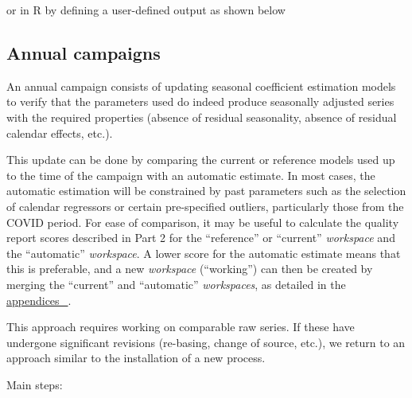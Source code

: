 \documentclass[
  letterpaper,
  DIV=11,
  numbers=noendperiod]{scrreprt}
\newenvironment{Shaded}{\begin{snugshade}}{\end{snugshade}}
\newcommand{\AttributeTok}[1]{\textcolor[rgb]{0.40,0.45,0.13}{#1}}
\newcommand{\FunctionTok}[1]{\textcolor[rgb]{0.28,0.35,0.67}{#1}}
\newcommand{\NormalTok}[1]{\textcolor[rgb]{0.00,0.23,0.31}{#1}}
\newcommand{\OtherTok}[1]{\textcolor[rgb]{0.00,0.23,0.31}{#1}}
\newcommand{\SpecialCharTok}[1]{\textcolor[rgb]{0.37,0.37,0.37}{#1}}
\newcommand{\StringTok}[1]{\textcolor[rgb]{0.13,0.47,0.30}{#1}}
\begin{document}
or in R by defining a user-defined output as shown below

\begin{Shaded}
\end{Shaded}

\hypertarget{camp-an}{%
\subsection*{Annual campaigns}\label{camp-an}}

An annual campaign consists of updating seasonal coefficient estimation
models to verify that the parameters used do indeed produce seasonally
adjusted series with the required properties (absence of residual
seasonality, absence of residual calendar effects, etc.).

This update can be done by comparing the current or reference models
used up to the time of the campaign with an automatic estimate. In most
cases, the automatic estimation will be constrained by past parameters
such as the selection of calendar regressors or certain pre-specified
outliers, particularly those from the COVID period. For ease of
comparison, it may be useful to calculate the quality report scores
described in Part 2 for the ``reference'' or ``current''
\emph{workspace} and the ``automatic'' \emph{workspace}. A lower score
for the automatic estimate means that this is preferable, and a new
\emph{workspace} (``working'') can then be created by merging the
``current'' and ``automatic'' \emph{workspaces}, as detailed in the
\protect\hyperlink{fusion-ws}{appendices~🔗}.

This approach requires working on comparable raw series. If these have
undergone significant revisions (re-basing, change of source, etc.), we
return to an approach similar to the installation of a new process.

Main steps:
\end{document}
